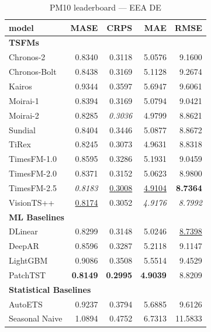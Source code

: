 \begin{table}[H]
\caption{PM10 leaderboard --- EEA DE}
\centering
\begin{small}
\begin{tabular}{lrrrr}
\toprule
model & MASE & CRPS & MAE & RMSE \\
\midrule
\multicolumn{5}{l}{\textbf{TSFMs}} \\
Chronos-2 & 0.8340 & 0.3118 & 5.0576 & 9.1600 \\
Chronos-Bolt & 0.8438 & 0.3169 & 5.1128 & 9.2674 \\
Kairos & 0.9344 & 0.3597 & 5.6947 & 9.6061 \\
Moirai-1 & 0.8394 & 0.3169 & 5.0794 & 9.0421 \\
Moirai-2 & 0.8285 & \textit{0.3036} & 4.9799 & 8.8621 \\
Sundial & 0.8404 & 0.3446 & 5.0877 & 8.8672 \\
TiRex & 0.8245 & 0.3073 & 4.9631 & 8.8318 \\
TimesFM-1.0 & 0.8595 & 0.3286 & 5.1931 & 9.0459 \\
TimesFM-2.0 & 0.8371 & 0.3152 & 5.0623 & 8.9800 \\
TimesFM-2.5 & \textit{0.8183} & \underline{0.3008} & \underline{4.9104} & \textbf{8.7364} \\
VisionTS++ & \underline{0.8174} & 0.3052 & \textit{4.9176} & \textit{8.7992} \\
\midrule
\multicolumn{5}{l}{\textbf{ML Baselines}} \\
DLinear & 0.8299 & 0.3148 & 5.0246 & \underline{8.7398} \\
DeepAR & 0.8596 & 0.3287 & 5.2118 & 9.1147 \\
LightGBM & 0.9086 & 0.3508 & 5.5514 & 9.4529 \\
PatchTST & \textbf{0.8149} & \textbf{0.2995} & \textbf{4.9039} & 8.8209 \\
\midrule
\multicolumn{5}{l}{\textbf{Statistical Baselines}} \\
AutoETS & 0.9237 & 0.3794 & 5.6885 & 9.6126 \\
Seasonal Naive & 1.0894 & 0.4752 & 6.7313 & 11.5833 \\
\bottomrule
\end{tabular}
\end{small}
\end{table}